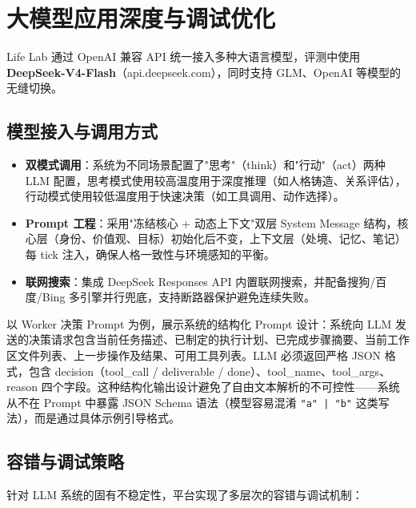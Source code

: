 \documentclass[12pt,a4paper]{article}%
\begin{document}
\section{大模型应用深度与调试优化}

Life Lab 通过 OpenAI 兼容 API 统一接入多种大语言模型，评测中使用 \textbf{DeepSeek-V4-Flash}（api.deepseek.com），同时支持 GLM、OpenAI 等模型的无缝切换。

\subsection{模型接入与调用方式}

\begin{itemize}
	\item \textbf{双模式调用}：系统为不同场景配置了"思考"（think）和"行动"（act）两种 LLM 配置，思考模式使用较高温度用于深度推理（如人格铸造、关系评估），行动模式使用较低温度用于快速决策（如工具调用、动作选择）。
	\item \textbf{Prompt 工程}：采用"冻结核心 + 动态上下文"双层 System Message 结构，核心层（身份、价值观、目标）初始化后不变，上下文层（处境、记忆、笔记）每 tick 注入，确保人格一致性与环境感知的平衡。
	\item \textbf{联网搜索}：集成 DeepSeek Responses API 内置联网搜索，并配备搜狗/百度/Bing 多引擎并行兜底，支持断路器保护避免连续失败。
\end{itemize}

以 Worker 决策 Prompt 为例，展示系统的结构化 Prompt 设计：系统向 LLM 发送的决策请求包含当前任务描述、已制定的执行计划、已完成步骤摘要、当前工作区文件列表、上一步操作及结果、可用工具列表。LLM 必须返回严格 JSON 格式，包含 decision（tool\_call / deliverable / done）、tool\_name、tool\_args、reason 四个字段。这种结构化输出设计避免了自由文本解析的不可控性——系统从不在 Prompt 中暴露 JSON Schema 语法（模型容易混淆 \texttt{"a" | "b"} 这类写法），而是通过具体示例引导格式。

\subsection{容错与调试策略}

针对 LLM 系统的固有不稳定性，平台实现了多层次的容错与调试机制：
\end{document}
